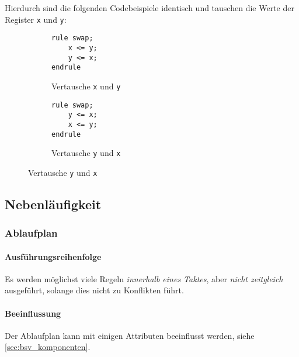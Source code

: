 \documentclass[a4paper, 11pt, accentcolor = tud3b]{tudreport}
\begin{document}
				Hierdurch sind die folgenden Codebeispiele identisch und tauschen die Werte der Register \texttt{x} und \texttt{y}:
				\begin{figure}[ht]
					\centering
					\begin{subfigure}{0.4\textwidth}
						\begin{lstlisting}
rule swap;
	x <= y;
	y <= x;
endrule
						\end{lstlisting}
						\caption{Vertausche \texttt{x} und \texttt{y}}
					\end{subfigure}
					\begin{subfigure}{0.4\textwidth}
						\begin{lstlisting}
rule swap;
	y <= x;
	x <= y;
endrule
						\end{lstlisting}
						\caption{Vertausche \texttt{y} und \texttt{x}}
					\end{subfigure}
				\end{figure}
			
			\subsection{Nebenläufigkeit}
				\subsubsection{Ablaufplan}
					\paragraph{Ausführungsreihenfolge}
						Es werden möglichst viele Regeln \textit{innerhalb eines Taktes}, aber \textit{nicht zeitgleich} ausgeführt, solange dies nicht zu Konflikten führt.
					
					\paragraph{Beeinflussung}
						Der Ablaufplan kann mit einigen Attributen beeinflusst werden, siehe \ref{sec:bsv_komponenten}.
				
\end{document}
